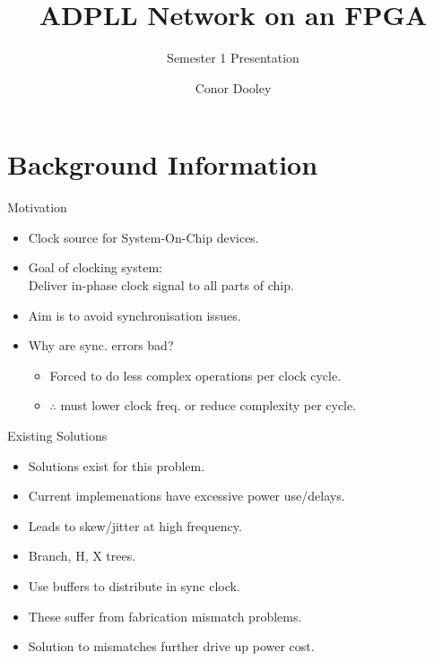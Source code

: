 \documentclass{beamer}
\title{ADPLL Network on an FPGA}
\author{Conor Dooley}
\subtitle{Semester 1 Presentation}
\begin{document}
\begin{frame}
    \titlepage
\end{frame}

\section*{Background Information}
\begin{frame}{Motivation}

    \begin{itemize}
        \item
            Clock source for System-On-Chip devices.
        \item
            Goal of clocking system:\\
            Deliver in-phase clock signal to all parts of chip.
        \item
            Aim is to avoid synchronisation issues.
        \item
            Why are sync. errors bad?
        \begin{itemize}
            \item
                Forced to do less complex operations per clock cycle.
            \item
                $ \therefore $ must lower clock freq. or reduce complexity per cycle.
        \end{itemize}
    \end{itemize}
 
\end{frame}
\begin{frame}{Existing Solutions}

    \begin{itemize}
        \item
            Solutions exist for this problem.
        \item
            Current implemenations have excessive power use/delays.
        \item
            Leads to skew/jitter at high frequency. %
        \item
            Branch, H, X trees.
        \item
            Use buffers to distribute in sync clock.
        \item
            These suffer from fabrication mismatch problems.
        \item
            Solution to mismatches further drive up power cost.
    \end{itemize}
 
\end{frame}
\end{document}
